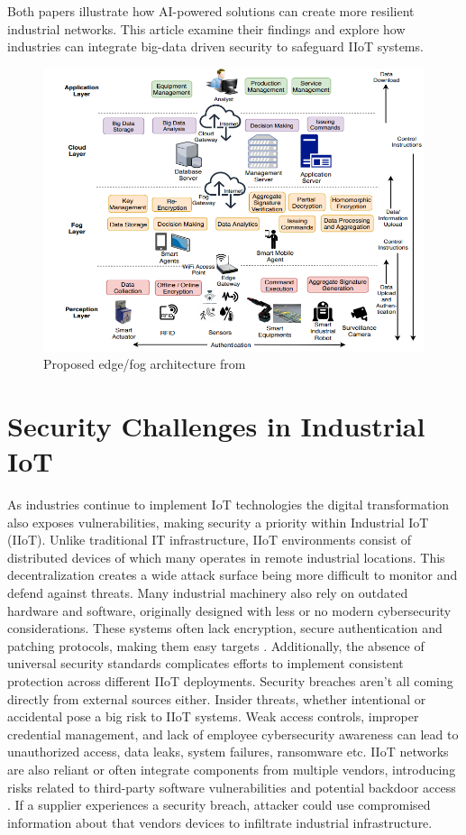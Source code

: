 \documentclass[article,a4paper]{IEEEtran}
\begin{document}
Both papers illustrate how AI-powered solutions can create more resilient industrial networks. This article examine their findings and explore how industries can integrate big-data driven security to safeguard IIoT systems.
\begin{figure}
    \includegraphics[width=\columnwidth]{Fog-basedarchitecture.png}
    \caption{ Proposed edge/fog architecture from \cite{fog} }
    \label{fig3: Architecture }
\end{figure}
\section{Security Challenges in Industrial IoT}
As industries continue to implement IoT technologies the digital transformation also exposes vulnerabilities, making security a priority within Industrial IoT (IIoT). Unlike traditional IT infrastructure, IIoT environments consist of distributed devices of which many operates in remote industrial locations. This decentralization creates a wide attack surface being more difficult to monitor and defend against threats. 
\newline\newline
Many industrial machinery also rely on outdated hardware and software, originally designed with less or no modern cybersecurity considerations. These systems often lack encryption, secure authentication and patching protocols, making them easy targets \cite{SurveySecurity}. Additionally, the absence of universal security standards complicates efforts to implement consistent protection across different IIoT deployments. Security breaches aren't all coming directly from external sources either. Insider threats, whether intentional or accidental pose a big risk to IIoT systems. Weak access controls, improper credential management, and lack of employee cybersecurity awareness can lead to unauthorized access, data leaks, system failures, ransomware etc. 
\newline\newline
IIoT networks are also reliant or often integrate components from multiple vendors, introducing risks related to third-party software vulnerabilities and potential backdoor access \cite{fog}. If a supplier experiences a security breach, attacker could use compromised information about that vendors devices to infiltrate industrial infrastructure.
\end{document}
